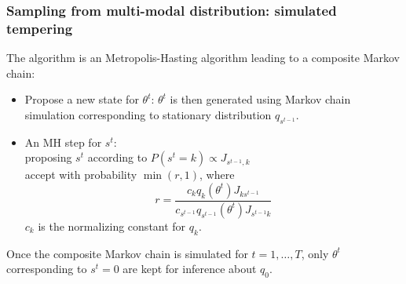 \documentclass{beamer}
\begin{document}
\begin{frame}
  \frametitle{Sampling from multi-modal distribution: simulated
    tempering}
The algorithm is an Metropolis-Hasting algorithm leading to a composite Markov
chain:
\begin{itemize}
\item Propose a new state for $\theta^t$: $\theta^{t}$ is then generated using Markov chain simulation
corresponding to stationary distribution $q_{s^{t-1}}$.
\item An MH step for $s^{t}$: \\
 proposing $s^t$ according to $P(s^t = k) \propto J_{s^{t-1}, k}$\\
 accept with probability $\min(r, 1)$, where 
\[
r = \frac{c_k q_k(\theta^{t}) J_{k s^{t-1}}}{c_{s^{t-1}} q_{s^{t-1}}(\theta^{t}) J_{s^{t-1} k}}
\]
$c_k$ is the normalizing constant for $q_k$.
\end{itemize}
Once the composite Markov chain is simulated for $t = 1, \ldots, T$,
only $\theta^t$ corresponding to $s^t = 0$ are kept for inference
about $q_0$.
\end{frame}

\end{document}
